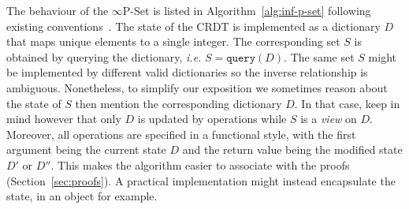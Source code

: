 \documentclass[11pt, oneside]{article}   	%
\begin{document}
The behaviour of the $\infty$P-Set is listed in Algorithm~\ref{alg:inf-p-set} following existing conventions~\cite{shapiro:inria-00555588}.  The state of the CRDT is implemented as a dictionary $D$ that 
maps unique elements to a single integer. The corresponding set $S$ is obtained by querying the dictionary, \textit{i.e.} $S=\texttt{query}(D)$. The same set $S$ might be implemented by different valid dictionaries so the inverse relationship is ambiguous. Nonetheless, to simplify our exposition we sometimes reason about the state of $S$ then mention the corresponding dictionary $D$. In that case, keep in mind however that only $D$ is updated by operations while $S$ is a \textit{view} on $D$. Moreover, all operations are specified in a functional style, with the first argument being the current state $D$ and the return value being the modified state $D'$ or $D''$. This makes the algorithm easier to associate with the proofs (Section~\ref{sec:proofs}). A practical implementation might instead encapsulate the state, in an object for example.
\end{document}
